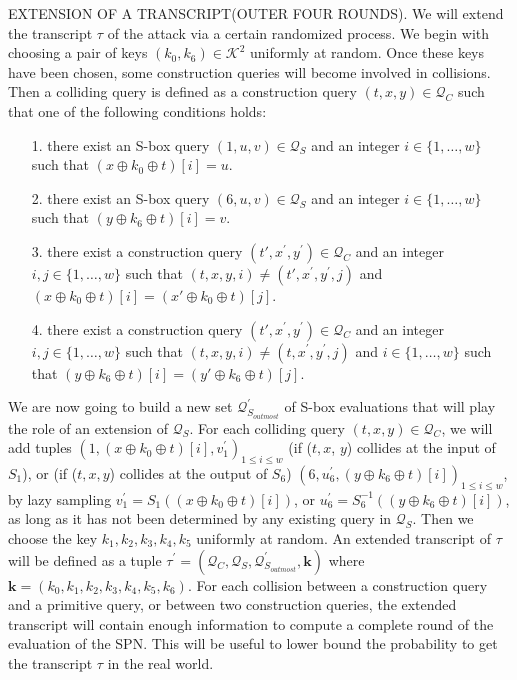 \noindent
\textsc{EXTENSION OF A TRANSCRIPT(OUTER FOUR ROUNDS)}. We will extend the transcript $\tau$ of the attack via a certain randomized process. We begin with choosing a pair of keys $\left(k_{0}, k_{6}\right) \in \mathcal{K}^{2}$ uniformly at random. Once these keys have been chosen, some construction queries will become involved in collisions. Then a colliding query is defined as a construction query $(t, x, y) \in \mathcal{Q}_{C}$ such that one of the following conditions holds:

\begin{itemize}
  \item[1.]
  there exist an S-box query $(1, u, v) \in \mathcal{Q}_{S}$ and an integer $i \in\{1, \ldots, w\}$ such that $\left(x \oplus k_{0} \oplus t \right)[i]=u$.
  \item[2.]
  there exist an S-box query $(6, u, v) \in \mathcal{Q}_{S}$ and an integer $i \in\{1, \ldots, w\}$ such that $\left(y \oplus k_{6} \oplus t \right)[i]=v$.
  \item[3.]
  there exist a construction query $\left(t', x^{\prime}, y^{\prime}\right) \in \mathcal{Q}_{C}$ and an integer $i,j \in\{1, \ldots, w\}$ such that $(t, x, y, i) \neq\left(t', x^{\prime}, y^{\prime}, j\right)$ and $\left(x \oplus k_{0} \oplus t \right)[i] = \left(x' \oplus k_{0} \oplus t \right)[j]$.
  \item[4.]
  there exist a construction query $\left(t', x^{\prime}, y^{\prime}\right) \in \mathcal{Q}_{C}$ and an integer $i,j \in\{1, \ldots, w\}$ such that $(t, x, y, i) \neq\left(t, x^{\prime}, y^{\prime}, j\right)$ and $i \in\{1, \ldots, w\}$ such that $\left(y \oplus k_{6} \oplus t \right)[i] = \left(y' \oplus k_{6} \oplus t\right)[j]$.
\end{itemize}

We are now going to build a new set $\mathcal{Q}_{S_{outmost}}^{\prime}$ of S-box evaluations that will play the role of an extension of $\mathcal{Q}_{S}$. For each colliding query $(t, x, y) \in \mathcal{Q}_{C}$, we will add tuples $\left(1, \left(x \oplus k_{0} \oplus t\right)[i], v_1^{\prime}\right)_{1 \leq i \leq w}$ (if ($t, \mathit{x}$, $\mathit{y}$) collides at the input of $S_1$), or (if ($t, \mathit{x}, \mathit{y}$) collides at the output of $S_6$) $\left(6, u_6^{\prime}, \left(y \oplus k_{6} \oplus t\right)[i]\right)_{1 \leq i \leq w}$, by lazy sampling $v_1^{\prime}=S_{1}(\left(x \oplus k_{0} \oplus t\right)[i])$, or $u_6^{\prime}=S_{6}^{-1}(\left(y \oplus k_{6} \oplus t\right)[i])$, as long as it has not been determined by any existing query in $\mathcal{Q}_{S}$. Then we choose the key $k_1, k_2, k_3, k_4, k_5$ uniformly at random. An extended transcript of $\tau$ will be defined as a tuple $\tau^{\prime}=\left(\mathcal{Q}_{C}, \mathcal{Q}_{S}, \mathcal{Q}_{S_{outmost}}^{\prime}, \mathbf{k}\right)$ where $\mathbf{k}=\left(k_{0}, k_{1}, k_{2},k_{3},k_{4}, k_{5}, k_{6}\right)$. For each collision between a construction query and a primitive query, or between two construction queries, the extended transcript will contain enough information to compute a complete round of the evaluation of the SPN. This will be useful to lower bound the probability to get the transcript $\tau$ in the real world.\\

